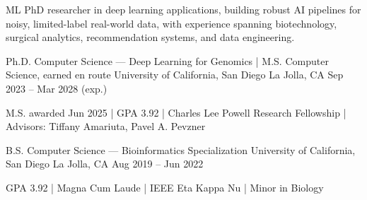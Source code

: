 \documentclass[11pt, a4paper]{awesome-cv}
\begin{document}
\makecvheader

\begin{cvparagraph}
ML PhD researcher in deep learning applications, building robust AI pipelines for noisy, limited-label real-world data, with experience spanning biotechnology, surgical analytics, recommendation systems, and data engineering.
\end{cvparagraph}

\begin{cventries}
\cventry
{Ph.D. Computer Science — Deep Learning for Genomics \quad | \quad M.S. Computer Science, earned en route}
{University of California, San Diego}
{La Jolla, CA}
{Sep 2023 -- Mar 2028 (exp.)}
{
\begin{cvitems}
\item {M.S. awarded Jun 2025 {\enspace}|{\enspace} GPA 3.92 {\enspace}|{\enspace} Charles Lee Powell Research Fellowship {\enspace}|{\enspace} Advisors: Tiffany Amariuta, Pavel A. Pevzner}
\end{cvitems}
}

\cventry
{B.S. Computer Science — Bioinformatics Specialization}
{University of California, San Diego}
{La Jolla, CA}
{Aug 2019 -- Jun 2022}
{
\begin{cvitems}
\item {GPA 3.92 {\enspace}|{\enspace} Magna Cum Laude {\enspace}|{\enspace} IEEE Eta Kappa Nu {\enspace}|{\enspace} Minor in Biology}
\end{cvitems}
}
\end{cventries}
\end{document}
